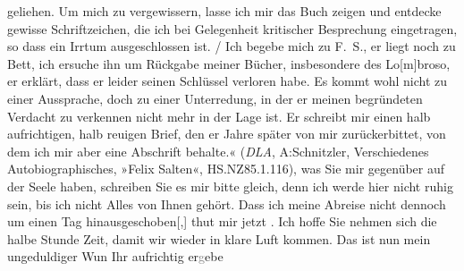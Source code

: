 \begin{ledgroupsized}[t]{13cm}
{{{                        geliehen. Um mich zu vergewissern, lasse ich mir das Buch zeigen und
                        entdecke gewisse Schriftzeichen, die ich bei Gelegenheit kritischer
                        Besprechung eingetragen, so dass ein Irrtum ausgeschlossen ist.{ / }Ich begebe mich zu F. S., er
                        liegt noch zu Bett, ich ersuche ihn um Rückgabe meiner Bücher, insbesondere
                        des Lo{[}m{]}broso, er erklärt,
                        dass er leider seinen Schlüssel verloren habe. Es kommt wohl nicht zu einer
                        Aussprache, doch zu einer Unterredung, in der er meinen begründeten Verdacht
                        zu verkennen nicht mehr in der Lage ist. Er schreibt mir einen halb
                        aufrichtigen, halb reuigen Brief, den er Jahre später von mir
                        zurückerbittet, von dem ich mir aber eine Abschrift behalte.«
                        (\emph{DLA}, A:Schnitzler, Verschiedenes
                     Autobiographisches, »Felix Salten«, HS.NZ85.1.116)}}}\label{K_L03186-1h}, was Sie mir
               gegenüber auf der Seele haben, schreiben Sie es mir bitte gleich, denn ich werde hier
               nicht ruhig sein, bis ich nicht Alles von Ihnen gehört. Dass ich meine Abreise nicht
               dennoch um einen Tag hinausgeschoben{[},{]} thut mir jetzt . Ich hoffe Sie nehmen sich die halbe Stunde
               Zeit, damit wir wieder in klare Luft kommen. Das ist nun mein ungeduldiger Wun\pend
           \pstart Ihr aufrichtig er\textcolor{gray}{g}ebe\pend{}
         
         \endnumbering{}\end{ledgroupsized}  \newcommand{\dateiname}{L03186}\newcommand{\titel}{Felix Salten an Arthur Schnitzler, 10. 8. 1892}\newcommand{\editorInnen}{Martin Anton Müller und Laura Untner}
      
